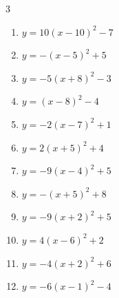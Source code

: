 \begin{multicols}{3}
\begin{enumerate}
  \item $\displaystyle y=10\left( x-10\right)^{2}-7$

        \phantom{$\displaystyle 頂点\left( 10 , -7 \right)$}

  \item $\displaystyle y=-\left( x-5\right)^{2}+5$

        \phantom{$\displaystyle 頂点\left( 5 , 5 \right)$}

  \item $\displaystyle y=-5\left( x+8\right)^{2}-3$

        \phantom{$\displaystyle 頂点\left( -8 , -3 \right)$}

  \item $\displaystyle y=\left( x-8\right)^{2}-4$

        \phantom{$\displaystyle 頂点\left( 8 , -4 \right)$}

  \item $\displaystyle y=-2\left( x-7\right)^{2}+1$

        \phantom{$\displaystyle 頂点\left( 7 , 1 \right)$}

  \item $\displaystyle y=2\left( x+5\right)^{2}+4$

        \phantom{$\displaystyle 頂点\left( -5 , 4 \right)$}

  \item $\displaystyle y=-9\left( x-4\right)^{2}+5$

        \phantom{$\displaystyle 頂点\left( 4 , 5 \right)$}

  \item $\displaystyle y=-\left( x+5\right)^{2}+8$

        \phantom{$\displaystyle 頂点\left( -5 , 8 \right)$}

  \item $\displaystyle y=-9\left( x+2\right)^{2}+5$

        \phantom{$\displaystyle 頂点\left( -2 , 5 \right)$}

  \item $\displaystyle y=4\left( x-6\right)^{2}+2$

        \phantom{$\displaystyle 頂点\left( 6 , 2 \right)$}

  \item $\displaystyle y=-4\left( x+2\right)^{2}+6$

        \phantom{$\displaystyle 頂点\left( -2 , 6 \right)$}

  \item $\displaystyle y=-6\left( x-1\right)^{2}-4$


\end{enumerate}
\end{multicols}
